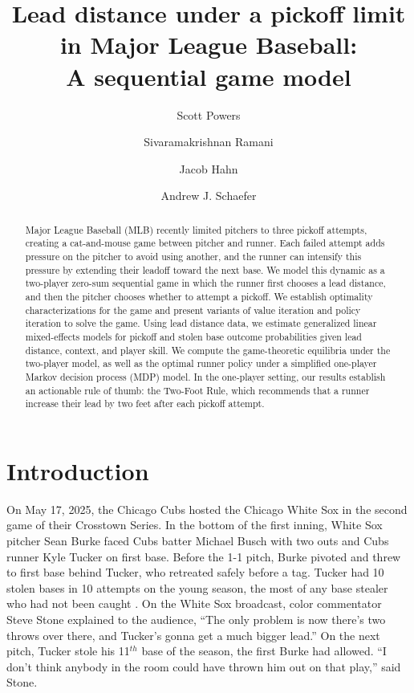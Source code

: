 \documentclass[11pt]{article}
\title{
  Lead distance under a pickoff limit in Major League Baseball:\\A sequential game model
}
\author[1]{Scott Powers}
\author[2]{Sivaramakrishnan Ramani}
\author[3]{Jacob Hahn}
\author[2]{Andrew J. Schaefer}
\affil[1]{\small Department of Sport Management, Rice University}
\affil[2]{\small Department of Computational Applied Mathematics and Operations Research, Rice University}
\affil[3]{\small Department of Statistics, Rice University}
\begin{document}
\date{}

  \maketitle

  \begin{abstract}
    Major League Baseball (MLB) recently limited pitchers to three pickoff attempts, creating a cat-and-mouse game between pitcher and runner. Each failed attempt adds pressure on the pitcher to avoid using another, and the runner can intensify this pressure by extending their leadoff toward the next base. We model this dynamic as a two-player zero-sum sequential game in which the runner first chooses a lead distance, and then the pitcher chooses whether to attempt a pickoff. We establish optimality characterizations for the game and present variants of value iteration and policy iteration to solve the game. Using lead distance data, we estimate generalized linear mixed-effects models for pickoff and stolen base outcome probabilities given lead distance, context, and player skill. We compute the game-theoretic equilibria under the two-player model, as well as the optimal runner policy under a simplified one-player Markov decision process (MDP) model. In the one-player setting, our results establish an actionable rule of thumb: the Two-Foot Rule, which recommends that a runner increase their lead by two feet after each pickoff attempt.
  \end{abstract}

  \section{Introduction}
  \label{sec:introduction}

    On May 17, 2025, the Chicago Cubs hosted the Chicago White Sox in the second game of their Crosstown Series. In the bottom of the first inning, White Sox pitcher Sean Burke faced Cubs batter Michael Busch with two outs and Cubs runner Kyle Tucker on first base. Before the 1-1 pitch, Burke pivoted and threw to first base behind Tucker, who retreated safely before a tag. Tucker had 10 stolen bases in 10 attempts on the young season, the most of any base stealer who had not been caught \parencite{fangraphs_major_2025}. On the White Sox broadcast, color commentator Steve Stone explained to the audience, ``The only problem is now there's two throws over there, and Tucker's gonna get a much bigger lead.'' On the next pitch, Tucker stole his 11$^{th}$ base of the season, the first Burke had allowed. ``I don't think anybody in the room could have thrown him out on that play,'' said Stone.
\end{document}
